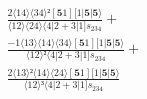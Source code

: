 \documentclass[varwidth, border=5pt]{standalone}
\begin{document}
\begin{my}
$\begin{gathered}
\scriptscriptstyle\frac{2⟨14⟩⟨34⟩²[𝟓1][1|𝟓|𝟓⟩}{⟨12⟩⟨24⟩⟨4|2+3|1]s_{234}} +\\
\scriptscriptstyle\frac{-1⟨13⟩⟨14⟩⟨34⟩[𝟓1][1|𝟓|𝟓⟩}{⟨12⟩²⟨4|2+3|1]s_{234}} +\\
\scriptscriptstyle\frac{2⟨13⟩²⟨14⟩⟨24⟩[𝟓1][1|𝟓|𝟓⟩}{⟨12⟩³⟨4|2+3|1]s_{234}} \phantom{+}
\end{gathered}$
\end{my}
\end{document}
